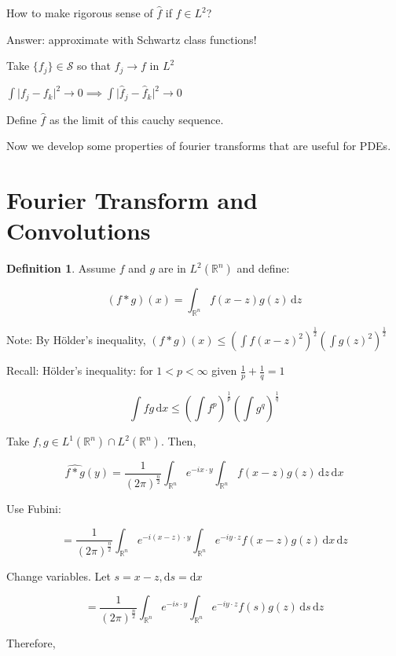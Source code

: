 \documentclass{article}
\theoremstyle{definition}
\newtheorem{definition}{Definition}
\begin{document}
How to make rigorous sense of \(\hat{f}\) if \(f\in L^2\)?

Answer: approximate with Schwartz class functions!

Take \(\{ f_j \} \in \mathcal{S}\) so that \(f_j \to f\) in \(L^2\) 

\(\int \vert f_j - f_k \vert ^2 \to 0 \implies \int \vert \hat{f}_j - \hat{f}_k \vert ^2\to 0\) 

Define \(\hat{f}\) as the limit of this cauchy sequence.

Now we develop some properties of fourier transforms that are useful for PDEs.

\section*{Fourier Transform and Convolutions}

\begin{definition}
    Assume \(f\) and \(g\) are in \(L^2(\mathbb{R} ^n)\) and define:

    \[
        (f\ast g)(x) = \int_{\mathbb{R} ^n}^{} f(x-z)g(z) \,\mathrm{d}z 
    \]

    Note: By H\"older's inequality, \((f\ast g)(x) \leq (\int f(x-z)^2)^{\frac{1}{2}}(\int g(z)^2)^{\frac{1}{2}}\) 
\end{definition}

Recall: H\"older's inequality: for \(1 < p < \infty \) given \(\frac{1}{p} + \frac{1}{q} = 1\)

\[
    \int fg\,\mathrm{d}x \leq \left(\int f^p\right)^\frac{1}{p}\left(\int g^q\right)^\frac{1}{q} 
\]

Take \(f,g\in L^1(\mathbb{R}^n)\cap L^2(\mathbb{R}^n)\). Then,

\[
    \widehat{f \ast g}(y) = \frac{1}{(2\pi)^\frac{n}{2}} \int_{\mathbb{R} ^n}^{} e^{-ix\cdot y}\int_{\mathbb{R} ^n}^{} f(x-z)g(z) \,\mathrm{d}z  \,\mathrm{d}x 
\]

Use Fubini:

\[
    =\frac{1}{(2\pi )^\frac{n}{2}} \int_{\mathbb{R}^n}^{} e^{-i(x-z)\cdot y} \int_{\mathbb{R} ^n}^{} e^{-iy\cdot z} f(x-z)g(z) \,\mathrm{d}x  \,\mathrm{d}z 
\]

Change variables. Let \(s = x-z, \mathrm{d}s=\mathrm{d}x  \) 

\[
    = \frac{1}{(2\pi)^{\frac{n}{2}}}\int_{\mathbb{R} ^n}^{} e^{-is\cdot y} \int_{\mathbb{R} ^n}^{} e^{-iy\cdot z} f(s)g(z) \,\mathrm{d}s  \,\mathrm{d}z 
\]

Therefore,
\end{document}
